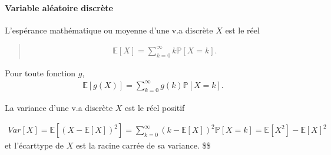 \documentclass[letterpaper,11pt,english]{sphinxmanual}
\begin{document}
\paragraph{Variable aléatoire discrète}
\label{\detokenize{chapter2:variable-aleatoire-discrete}}
\begin{DUlineblock}{0em}
\item[] 
\item[] L’espérance mathématique ou moyenne d’une v.a discrète \(X\) est
le réel
\end{DUlineblock}
\begin{quote}
\begin{equation}\label{equation:chapter2:chapter2:40}
\begin{split}\mathbb{E}[X] = \sum_{k=0}^{\infty} k \mathbb{P}[X = k].\end{split}
\end{equation}\end{quote}

\sphinxAtStartPar
Pour toute fonction \(g\),
\begin{equation}\label{equation:chapter2:chapter2:41}
\begin{split}\mathbb{E}[g(X)] = \sum_{k=0}^{\infty} g(k) \mathbb{P}[X = k].\end{split}
\end{equation}
\begin{DUlineblock}{0em}
\item[] 
\item[] La variance d’une v.a discrète \(X\) est le réel positif
\end{DUlineblock}
\begin{equation}\label{equation:chapter2:chapter2:42}
\begin{split}Var[X] = \mathbb{E}\left[(X-\mathbb{E}[X])^2\right] = \sum_{k=0}^{\infty} \left(k-\mathbb{E}[X]\right)^2 \mathbb{P}[X = k] = \mathbb{E}[X^2] -
\mathbb{E}[X]^2\end{split}
\end{equation}
\sphinxAtStartPar
et l’écart\sphinxhyphen{}type de \(X\) est la racine carrée de sa variance. \$\$
\end{document}
